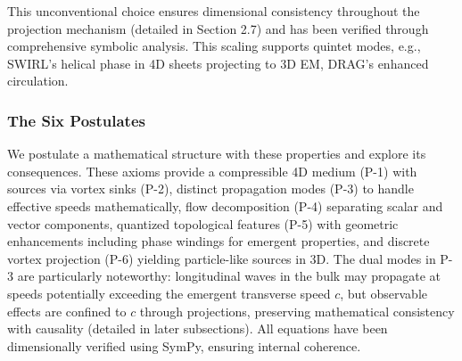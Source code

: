 This unconventional choice ensures dimensional consistency throughout the projection mechanism (detailed in Section 2.7) and has been verified through comprehensive symbolic analysis. This scaling supports quintet modes, e.g., SWIRL's helical phase in 4D sheets projecting to 3D EM, DRAG's enhanced circulation.

\subsubsection{The Six Postulates}

We postulate a mathematical structure with these properties and explore its consequences. These axioms provide a compressible 4D medium (P-1) with sources via vortex sinks (P-2), distinct propagation modes (P-3) to handle effective speeds mathematically, flow decomposition (P-4) separating scalar and vector components, quantized topological features (P-5) with geometric enhancements including phase windings for emergent properties, and discrete vortex projection (P-6) yielding particle-like sources in 3D. The dual modes in P-3 are particularly noteworthy: longitudinal waves in the bulk may propagate at speeds potentially exceeding the emergent transverse speed $c$, but observable effects are confined to $c$ through projections, preserving mathematical consistency with causality (detailed in later subsections). All equations have been dimensionally verified using SymPy, ensuring internal coherence.

